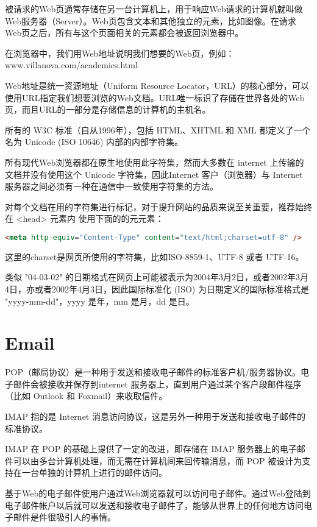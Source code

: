 被请求的Web页通常存储在另一台计算机上，用于响应Web请求的计算机就叫做Web服务器（Server）。Web页包含文本和其他独立的元素，比如图像。在请求Web页之后，所有与这个页面相关的元素都会被返回浏览器中。


在浏览器中，我们用Web地址说明我们想要的Web页，例如：www.villanova.com/academics.html

Web地址是统一资源地址（Uniform Resource Locator，URL）的核心部分，可以使用URL指定我们想要浏览的Web文档。URL唯一标识了存储在世界各处的Web页，而且URL的一部分是存储信息的计算机的主机名。



所有的 W3C 标准（自从1996年），包括 HTML、XHTML 和 XML 都定义了一个名为 Unicode (ISO 10646) 内部的内部字符集。

所有现代Web浏览器都在原生地使用此字符集，然而大多数在 internet 上传输的文档并没有使用这个 Unicode 字符集，因此Internet 客户（浏览器）与 Internet 服务器之间必须有一种在通信中一致使用字符集的方法。

对每个文档在用的字符集进行标记，对于提升网站的品质来说至关重要，推荐始终在 <head> 元素内 使用下面的的元元素：

\begin{lstlisting}[language=HTML]
<meta http-equiv="Content-Type" content="text/html;charset=utf-8" />
\end{lstlisting}

这里的charset是网页所使用的字符集，比如ISO-8859-1、UTF-8 或者 UTF-16。

类似 "04-03-02" 的日期格式在网页上可能被表示为2004年3月2日，或者2002年3月4日，亦或者2002年4月3日，因此国际标准化 (ISO) 为日期定义的国际标准格式是 "yyyy-mm-dd"，yyyy 是年，mm 是月，dd 是日。


\section{Email}


POP（邮局协议）是一种用于发送和接收电子邮件的标准客户机/服务器协议。电子邮件会被接收并保存到internet 服务器上，直到用户通过某个客户段邮件程序（比如 Outlook 和 Foxmail）来收取信件。


IMAP 指的是 Internet 消息访问协议，这是另外一种用于发送和接收电子邮件的标准协议。

IMAP 在 POP 的基础上提供了一定的改进，即存储在 IMAP 服务器上的电子邮件可以由多台计算机处理，而无需在计算机间来回传输消息，而 POP 被设计为支持在一台单独的计算机上进行的邮件访问。


基于Web的电子邮件使用户通过Web浏览器就可以访问电子邮件。通过Web登陆到电子邮件帐户以后就可以发送和接收电子邮件了，能够从世界上的任何地方访问电子邮件是件很吸引人的事情。


